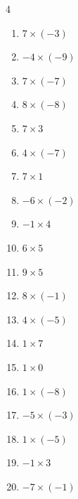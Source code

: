 \begin{multicols}{4}
\begin{enumerate}
  \item $7\times (-3)$
        \phantom{$=-21$}

  \item $-4\times (-9)$
        \phantom{$=36$}

  \item $7\times (-7)$
        \phantom{$=-49$}

  \item $8\times (-8)$
        \phantom{$=-64$}

  \item $7\times 3$
        \phantom{$=21$}

  \item $4\times (-7)$
        \phantom{$=-28$}

  \item $7\times 1$
        \phantom{$=7$}

\columnbreak %

  \item $-6\times (-2)$
        \phantom{$=12$}

  \item $-1\times 4$
        \phantom{$=-4$}

  \item $6\times 5$
        \phantom{$=30$}

  \item $9\times 5$
        \phantom{$=45$}

  \item $8\times (-1)$
        \phantom{$=-8$}

  \item $4\times (-5)$
        \phantom{$=-20$}

  \item $1\times 7$
        \phantom{$=7$}

  \item $1\times 0$
        \phantom{$=0$}

  \item $1\times (-8)$
        \phantom{$=-8$}

  \item $-5\times (-3)$
        \phantom{$=15$}

  \item $1\times (-5)$
        \phantom{$=-5$}

  \item $-1\times 3$
        \phantom{$=-3$}

  \item $-7\times (-1)$
        \phantom{$=7$}


\end{enumerate}
\end{multicols}

